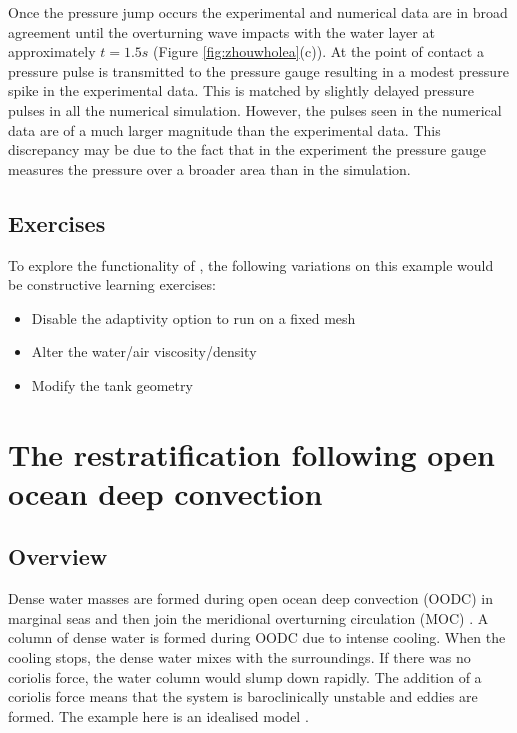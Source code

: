 Once the pressure jump occurs the experimental and numerical data are in broad agreement until the overturning wave impacts with the water layer at approximately $t=1.5s$ (Figure \ref{fig:zhouwholea}(c)).  At the point of contact a pressure pulse is transmitted to the pressure gauge resulting in a modest pressure spike in the experimental data.  This is matched by slightly delayed pressure pulses in all the numerical simulation.  However, the pulses seen in the numerical data are of a much larger magnitude than the experimental data. This discrepancy may be due to the fact that in the experiment the pressure gauge measures the pressure over a broader area than in the simulation. 

\subsection{Exercises}
To explore the functionality of \fluidity, the following variations on this example would be constructive learning exercises:

\begin{itemize}
\item Disable the adaptivity option to run on a fixed mesh
\item Alter the water/air viscosity/density
\item Modify the tank geometry
\end{itemize}




\section{The restratification following open ocean deep convection}

\subsection{Overview}

Dense water masses are formed during open ocean deep convection (OODC) in marginal seas and then join the meridional overturning circulation (MOC)  \citep{jones1997}.  A column of dense water is formed during OODC due to intense cooling. When the cooling stops, the dense water mixes with the surroundings. If there was no coriolis force, the water column would slump down rapidly.  The addition of a coriolis force means that the system is baroclinically unstable and eddies are formed. The example here is an idealised model  \citep{rousset09}. 


